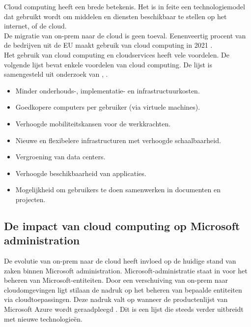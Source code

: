 
Cloud computing heeft een brede betekenis. Het is in feite een technologiemodel dat gebruikt wordt om middelen en diensten beschikbaar te stellen op het internet, of de cloud. \autocite{Haag2009} \\

De migratie van \ac{on-prem} naar de cloud is geen toeval. Eenenveertig procent van de bedrijven uit de \ac{EU} maakt gebruik van cloud computing in 2021 \autocite{EU2021}. \\

Het gebruik van cloud computing en cloudservices heeft vele voordelen. De volgende lijst bevat enkele voordelen van cloud computing. De lijst is samengesteld uit onderzoek van \textcite{Aljabre2012}, \textcite{Rittinghouse2016}.

\begin{itemize}
    \item Minder onderhouds-, implementatie- en infrastructuurkosten.
    \item Goedkopere computers per gebruiker (via virtuele machines).
    \item Verhoogde mobiliteitskansen voor de werkkrachten.
    \item Nieuwe en flexibelere infrastructuren met verhoogde schaalbaarheid.
    \item Vergroening van data centers.
    \item Verhoogde beschikbaarheid van applicaties.
    \item Mogelijkheid om gebruikers te doen samenwerken in documenten en projecten.
\end{itemize}

\subsection{De impact van cloud computing op Microsoft administration}


De evolutie van \ac{on-prem} naar de cloud heeft invloed op de huidige stand van zaken binnen Microsoft administration. Microsoft-administratie staat in voor het beheren van Microsoft-entiteiten. Door een verschuiving van \ac{on-prem} naar cloudomgevingen ligt stilaan de nadruk op het beheren van bepaalde entiteiten via cloudtoepassingen. Deze nadruk valt op wanneer de productenlijst van Microsoft Azure wordt geraadpleegd \autocite{Microsoft2023b}. Dit is een lijst die steeds verder  uitbreidt met nieuwe technologieën. \\

